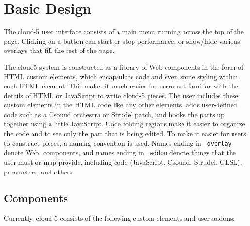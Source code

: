 \documentclass[runningheads,a4paper]{llncs}
\begin{document}
\section{Basic Design}

The cloud-5 user interface consists of a main menu running across the top of the page. Clicking on a button can start or stop performance, or show/hide various overlays that fill the rest of the page. 

The cloud5-system is constructed as a library of Web components in the form of HTML custom elements, which encapsulate code and even some styling within each HTML element. This makes it much easier for users not familiar with the details of HTML or JavaScript to write cloud-5 pieces. The user includes these custom elements in the HTML code like any other elements, adds user-defined code such as a Csound orchestra or Strudel patch, and hooks the parts up together using a little JavaScript. Code folding regions make it easier to organize the code and to see only the part that is being edited. To make it easier for users to construct pieces, a naming convention is used. Names ending in \texttt{\_overlay} denote Web. components, and names ending in \texttt{\_addon} denote things that the user must or map provide, including code (JavaScript, Csound, Strudel, GLSL), parameters, and others.

\subsection{Components}

Currently, cloud-5 consists of the following custom elements and user addons:
\end{document}

